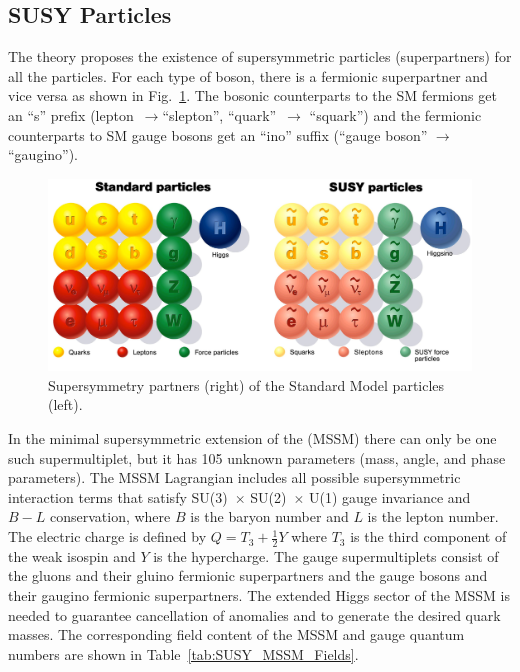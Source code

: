 \subsection{SUSY Particles}
The theory proposes the existence of supersymmetric particles (superpartners) for all the \SM particles. For each type of \SM boson, there is a fermionic superpartner and vice versa as shown in Fig.~\ref{fig:SM_SUSY_Particles}. The bosonic counterparts to the SM fermions get an ``s'' prefix (lepton~$\to$``slepton'', ``quark''~$\to$ ``squark'') and the fermionic counterparts to SM gauge bosons get an ``ino'' suffix (``gauge boson'' $\to$ ``gaugino'').

\begin{figure}[htbm]
 \centering
 \includegraphics[keepaspectratio=true, scale=0.5]{./SM_SUSY_particles.pdf}
 \caption[Supersymmetry particles.]{Supersymmetry partners (right) of the Standard Model particles (left).}
 \label{fig:SM_SUSY_Particles}
\end{figure}
\vspace{-0.01\textheight}

In the minimal supersymmetric extension of the \SM (MSSM) there can only be one such supermultiplet, but it has 105 unknown parameters (mass, angle, and phase parameters). The MSSM Lagrangian includes all possible supersymmetric interaction terms that satisfy SU(3)~$\times$ SU(2)~$\times$ U(1) gauge invariance and $B-L$ conservation, where $B$ is the baryon number and $L$ is the lepton number. The electric charge is defined by $Q=T_{3}+\frac{1}{2}Y$ where $T_{3}$ is the third component of the weak isospin and $Y$ is the hypercharge. The gauge supermultiplets consist of the gluons and their gluino fermionic superpartners and the gauge bosons and their gaugino fermionic superpartners. The extended Higgs sector of the MSSM is needed to guarantee cancellation of anomalies and to generate the desired quark masses. The corresponding field content of the MSSM and gauge quantum numbers are shown in Table~\ref{tab:SUSY_MSSM_Fields}.


